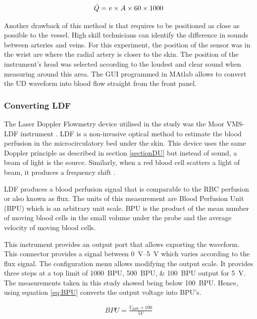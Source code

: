 \begin{align}
	\label{eq:flow_l/min}
	\dot{Q} = v \times A \times 60 \times 1000 \tagaddtext{[\si{\cubic\meter\per\second}]}
\end{align}

Another drawback of this method is that requires to be positioned as close as possible to the vessel. High skill technicians can identify the difference in sounds between arteries and veins. For this experiment, the position of the sensor was in the wrist are where the radial artery is closer to the skin. The position of the instrument's head was selected according to the loudest and clear sound when measuring around this area. The GUI programmed in MAtlab allows to convert the UD waveform into blood flow straight from the front panel.

\subsubsection{Converting LDF}
\label{section:ldf}
The Laser Doppler Flowmetry device utilised in the study was the Moor VMS-LDF instrument \cite{moor:LDF2}. LDF is a non-invasive optical method to estimate the blood perfusion in the microcirculatory bed under the skin. This device uses the same Doppler principle as described in section \ref{sectionDU} but instead of sound, a beam of light is the source. Similarly, when a red blood cell scatters a light of beam, it produces a frequency shift \cite{fredriksson2007laser}. 

LDF produces a blood perfusion signal that is comparable to the RBC perfusion or also known as flux. The units of this measurement are Blood Perfusion Unit (BPU) which is an arbitrary unit scale. BPU is the product of the mean number of moving blood cells in the small volume under the probe and the average velocity of moving blood cells. 

This instrument provides an output port that allows exporting the waveform. This connector provides a signal between \SIrange{0}{5}{\volt} which varies according to the flux signal. The configuration menu allows modifying the output scale. It provides three steps at a top limit of \SIlist{1000;500;100}{BPU} output for \SI{5}{\volt}. The measurements taken in this study showed being below \SI{100}{BPU}. Hence, using equation \ref{eq:BPU} converts the output voltage into BPU's.

\begin{align}
	\label{eq:BPU}
	BPU = \frac{V_{BPU} \times 100}{5 V}
\end{align}

